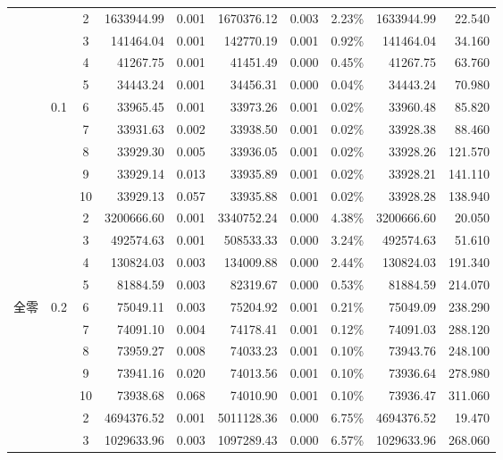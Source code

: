 {\begin{longtable}{cccrcrrcrr}
	\hline
	\endlastfoot
		&       & 2     & 1633944.99 & 0.001 & 1670376.12 & 0.003 & 2.23\% & 1633944.99 & 22.540 \\
		&       & 3     & 141464.04 & 0.001 & 142770.19 & 0.001 & 0.92\% & 141464.04 & 34.160 \\
		&       & 4     & 41267.75 & 0.001 & 41451.49 & 0.000 & 0.45\% & 41267.75 & 63.760 \\
		&       & 5     & 34443.24 & 0.001 & 34456.31 & 0.000 & 0.04\% & 34443.24 & 70.980 \\
		& 0.1   & 6     & 33965.45 & 0.001 & 33973.26 & 0.001 & 0.02\% & 33960.48 & 85.820 \\
		&       & 7     & 33931.63 & 0.002 & 33938.50 & 0.001 & 0.02\% & 33928.38 & 88.460 \\
		&       & 8     & 33929.30 & 0.005 & 33936.05 & 0.001 & 0.02\% & 33928.26 & 121.570 \\
		&       & 9     & 33929.14 & 0.013 & 33935.89 & 0.001 & 0.02\% & 33928.21 & 141.110 \\
		&       & 10    & 33929.13 & 0.057 & 33935.88 & 0.001 & 0.02\% & 33928.28 & 138.940 \\
		&       & 2     & 3200666.60 & 0.001 & 3340752.24 & 0.000 & 4.38\% & 3200666.60 & 20.050 \\
		&       & 3     & 492574.63 & 0.001 & 508533.33 & 0.000 & 3.24\% & 492574.63 & 51.610 \\
		&       & 4     & 130824.03 & 0.003 & 134009.88 & 0.000 & 2.44\% & 130824.03 & 191.340 \\
		&       & 5     & 81884.59 & 0.003 & 82319.67 & 0.000 & 0.53\% & 81884.59 & 214.070 \\
	\multicolumn{1}{l}{全零} & 0.2   & 6     & 75049.11 & 0.003 & 75204.92 & 0.001 & 0.21\% & 75049.09 & 238.290 \\
		&       & 7     & 74091.10 & 0.004 & 74178.41 & 0.001 & 0.12\% & 74091.03 & 288.120 \\
		&       & 8     & 73959.27 & 0.008 & 74033.23 & 0.001 & 0.10\% & 73943.76 & 248.100 \\
		&       & 9     & 73941.16 & 0.020 & 74013.56 & 0.001 & 0.10\% & 73936.64 & 278.980 \\
		&       & 10    & 73938.68 & 0.068 & 74010.90 & 0.001 & 0.10\% & 73936.47 & 311.060 \\
		&       & 2     & 4694376.52 & 0.001 & 5011128.36 & 0.000 & 6.75\% & 4694376.52 & 19.470 \\
		&       & 3     & 1029633.96 & 0.003 & 1097289.43 & 0.000 & 6.57\% & 1029633.96 & 268.060 \\

\end{longtable}}
